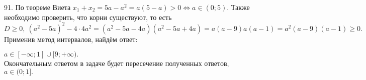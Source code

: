 91. По теореме Виета $x_1+x_2=5a-a^2=a(5-a)>0\Leftrightarrow a\in(0;5).$ Также необходимо проверить, что корни существуют, то есть $D\geqslant0,\ (a^2-5a)^2-4\cdot4a^2=(a^2-5a-4a)(a^2-5a+4a)=a(a-9)a(a-1)=a^2(a-9)(a-1)\geqslant0.$ Применив метод интервалов, найдём ответ:
\begin{figure}[ht!]
\end{figure}
$a\in[-\infty;1]\cup[9;+\infty).$\\ Окончательным ответом в задаче будет пересечение полученных ответов, $a\in (0;1].$\\
